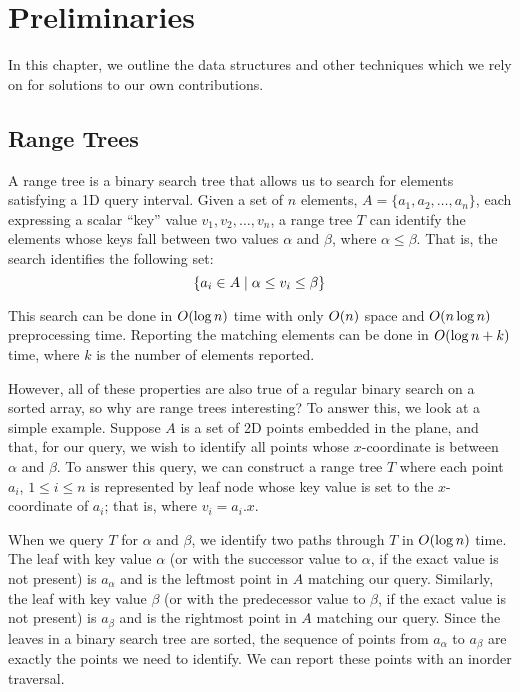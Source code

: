 \chapter{Preliminaries}
\label{:prelim}

In this chapter, we outline the data structures and other techniques which we rely on for solutions to our own contributions.

\section{Range Trees}
\label{:prelim:range-trees}

A range tree is a binary search tree that allows us to search for elements satisfying a 1D query interval.
Given a set of $n$ elements, $A = \{a_1, a_2, \ldots, a_n\}$, each expressing a scalar ``key'' value $v_1, v_2, \ldots, v_n$, a range tree $T$ can identify the elements whose keys fall between two values $\alpha$ and $\beta$, where $\alpha \leq \beta$.
That is, the search identifies the following set:
\[
\{ a_i \in A \;|\; \alpha \leq v_i \leq \beta \}
\]

This search can be done in $O\!\left(\log{n}\right)$ time with only $O\!\left(n\right)$ space and $O\!\left(n\log{n}\right)$ preprocessing time.
Reporting the matching elements can be done in $O\!\left(\log{n} + k\right)$ time, where $k$ is the number of elements reported. 

However, all of these properties are also true of a regular binary search on a sorted array, so why are range trees interesting? 
To answer this, we look at a simple example.
Suppose $A$ is a set of 2D points embedded in the plane, and that, for our query, we wish to identify all points whose $x$-coordinate is between $\alpha$ and $\beta$.
To answer this query, we can construct a range tree $T$ where each point $a_i$, $1 \leq i \leq n$ is represented by leaf node whose key value is set to the $x$-coordinate of $a_i$; that is, where $v_i = a_i.x$.

When we query $T$ for $\alpha$ and $\beta$, we identify two paths through $T$ in $O\!\left(\log{n}\right)$ time.
The leaf with key value $\alpha$ (or with the successor value to $\alpha$, if the exact value is not present) is $a_\alpha$ and is the leftmost point in $A$ matching our query.
Similarly, the leaf with key value $\beta$ (or with the  predecessor value to $\beta$, if the exact value is not present) is $a_\beta$ and is the rightmost point in $A$ matching our query.
Since the leaves in a binary search tree are sorted, the sequence of points from $a_\alpha$ to $a_\beta$ are exactly the points we need to identify. 
We can report these points with an inorder traversal.

